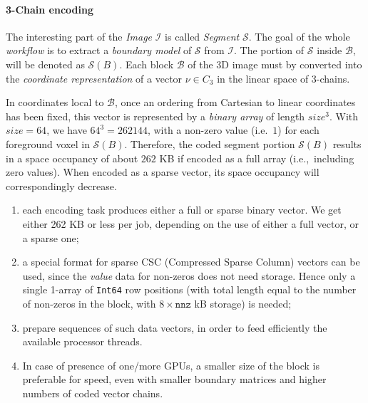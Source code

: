 \paragraph{3-Chain encoding}
\label{chain-coding}
The interesting part of the \emph{Image} $\mathcal{I}$ is called \emph{Segment} $\mathcal{S}$. The goal of the whole \emph{workflow} is to extract a \emph{boundary model} of $\mathcal{S}$ from $\mathcal{I}$. The portion of $\mathcal{S}$ inside $\mathcal{B}$, will be denoted as $\mathcal{S}(B)$.
Each block $\mathcal{B}$ of the 3D image must by converted into the \emph{coordinate representation} of a vector $\nu\in C_3$ in the linear space  of 3-chains. 

In coordinates local to $\mathcal{B}$, once an ordering from Cartesian to linear coordinates has been fixed, this vector is represented by a \emph{binary array} of length $size^3$. With $size=64$, we have $64^3=262144$,  with a non-zero value (i.e.~$1$) for each foreground voxel in $\mathcal{S}(B)$. Therefore, the coded segment portion $\mathcal{S}(B)$ results in a space occupancy of about $262$ KB if encoded as a full array (i.e.,~including zero values). When encoded as a sparse vector, its space occupancy will correspondingly decrease.

\begin{enumerate}

\item each encoding task produces either a full or sparse binary vector. 
We get either 262 KB or less per job, depending on the use of either a full vector, or a sparse one;

\item a special format for sparse CSC (Compressed Sparse Column) vectors can be used, since the \emph{value} data for non-zeros does not need storage. Hence only a single 1-array of \texttt{Int64} row positions (with total length equal to the number of non-zeros in the block, with $8\times\mathtt{nnz}$ kB storage) is needed;

\item prepare sequences of such data vectors, in order to feed efficiently the available processor threads.
\item In case of presence of one/more GPUs, a smaller size of the block is preferable for speed, even with smaller boundary matrices and higher numbers of coded vector chains.

\end{enumerate}

